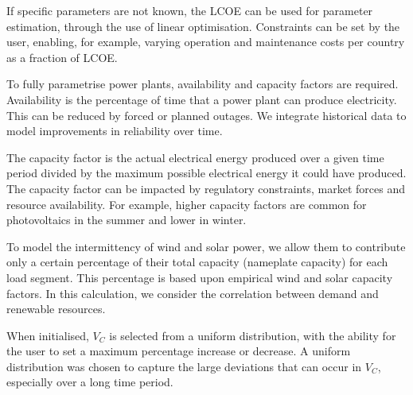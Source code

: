 

If specific parameters are not known, the LCOE can be used for parameter estimation, through the use of linear optimisation. Constraints can be set by the user, enabling, for example, varying operation and maintenance costs per country as a fraction of LCOE.

To fully parametrise power plants, availability and capacity factors are required. Availability is the percentage of time that a power plant can produce electricity. This can be reduced by forced or planned outages. We integrate historical data to model improvements in reliability over time.

The capacity factor is the actual electrical energy produced over a given time period divided by the maximum possible electrical energy it could have produced. The capacity factor can be impacted by regulatory constraints, market forces and resource availability. For example, higher capacity factors are common for photovoltaics in the summer and lower in winter. 

To model the intermittency of wind and solar power, we allow them to contribute only a certain percentage of their total capacity (nameplate capacity) for each load segment. This percentage is based upon empirical wind and solar capacity factors. In this calculation, we consider the correlation between demand and renewable resources. 

When initialised, $V_C$ is selected from a uniform distribution, with the ability for the user to set a maximum percentage increase or decrease. A uniform distribution was chosen to capture the large deviations that can occur in $V_C$, especially over a long time period. \vphantom{By doing this, the variance in costs between individual power plants for processes such as preventative and corrective maintenance, labour costs and skill, health and safety and chance are different per plant instant.}

